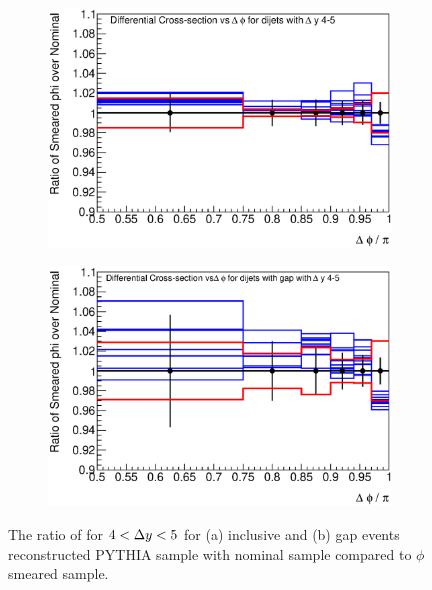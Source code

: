 \begin{figure}
\centering
        \begin{subfigure}[b]{0.5\textwidth}
                \centering
                \includegraphics[width=\textwidth]{figures/GBJ2/ResoPhi/RMS_phi___dPhi__4_5_Ratio.eps}
        \end{subfigure}%
        \begin{subfigure}[b]{0.5\textwidth}
                \centering
                \includegraphics[width=\textwidth]{figures/GBJ2/ResoPhi/RMS_phi___dPhi_gap__4_5_Ratio.eps}
        \end{subfigure}%
\caption[Uncertainty bands due to the jet $\phi$ resolution for \dphiDist{} for $4<\dy{}<5$]{
The ratio of \dphiDist{} for $4<\dy{}<5$ for (a) inclusive and (b) gap events reconstructed PYTHIA sample with nominal sample compared to $\phi$ smeared sample.
\label{GBJ2:ResoPhi:dphi45}}
\end{figure}




